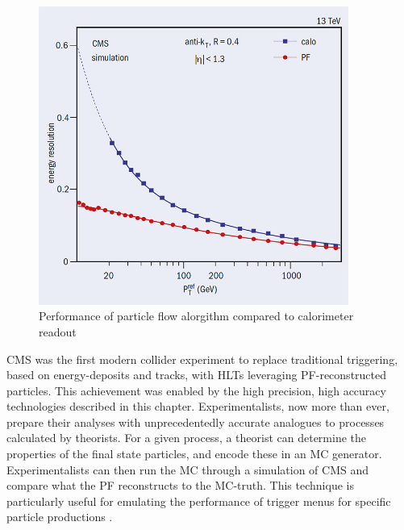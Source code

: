 \begin{figure}[]
\begin{centering}
\includegraphics[width=4in]{Chapter3/importfigs/CCrec2_05_16.jpg}
\par\end{centering}
\caption{Performance of particle flow alorgithm compared to calorimeter readout \cite{Sirunyan:2017ulk} \label{fig:pfPerf}}
\end{figure}

CMS was the first modern collider experiment to replace traditional triggering, based on energy-deposits and tracks, with HLTs leveraging PF-reconstructed particles. This achievement was enabled by the high precision, high accuracy technologies described in this chapter. Experimentalists, now more than ever, prepare their analyses with unprecedentedly accurate analogues to processes calculated by theorists. For a given process, a theorist can determine the properties of the final state particles, and encode these in an MC generator. Experimentalists can then run the MC through a simulation of CMS and compare what the PF reconstructs to the MC-truth. This technique is particularly useful for emulating the performance of trigger menus for specific particle productions \cite{Beaudette:2014cea}. 